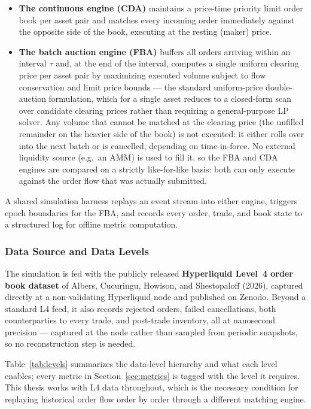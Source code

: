 \documentclass[11pt]{article}
\begin{document}
\begin{itemize}
    \item \textbf{The continuous engine (CDA)} maintains a price-time priority limit order book per asset pair and matches every incoming order immediately against the opposite side of the book, executing at the resting (maker) price.
    \item \textbf{The batch auction engine (FBA)} buffers all orders arriving within an interval $\tau$ and, at the end of the interval, computes a single uniform clearing price per asset pair by maximizing executed volume subject to flow conservation and limit price bounds --- the standard uniform-price double-auction formulation, which for a single asset reduces to a closed-form scan over candidate clearing prices rather than requiring a general-purpose LP solver. Any volume that cannot be matched at the clearing price (the unfilled remainder on the heavier side of the book) is not executed: it either rolls over into the next batch or is cancelled, depending on time-in-force. No external liquidity source (e.g.\ an AMM) is used to fill it, so the FBA and CDA engines are compared on a strictly like-for-like basis: both can only execute against the order flow that was actually submitted.
\end{itemize}

A shared simulation harness replays an event stream into either engine, triggers epoch boundaries for the FBA, and records every order, trade, and book state to a structured log for offline metric computation.

\subsubsection{Data Source and Data Levels}
\label{sec:data}

The simulation is fed with the publicly released \textbf{Hyperliquid Level~4 order book dataset} of Albers, Cucuringu, Howison, and Shestopaloff (2026), captured directly at a non-validating Hyperliquid node and published on Zenodo. Beyond a standard L4 feed, it also records rejected orders, failed cancellations, both counterparties to every trade, and post-trade inventory, all at nanosecond precision — captured at the node rather than sampled from periodic snapshots, so no reconstruction step is needed.

Table~\ref{tab:levels} summarizes the data-level hierarchy and what each level enables; every metric in Section~\ref{sec:metrics} is tagged with the level it requires. This thesis works with L4 data throughout, which is the necessary condition for replaying historical order flow order by order through a different matching engine.
\end{document}
